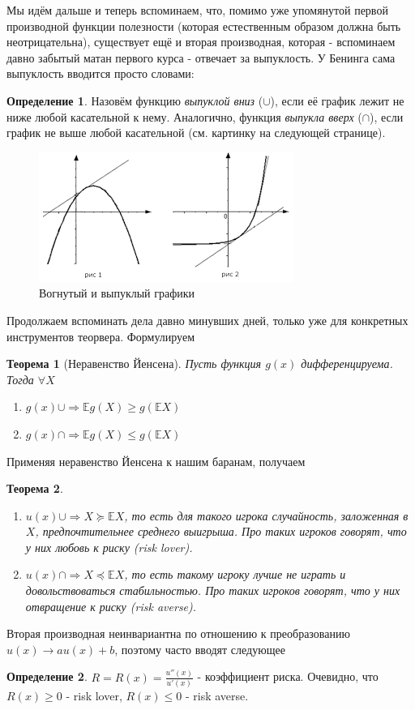 \documentclass{article}
\newtheorem{theorem}{Теорема}
\theoremstyle{definition}
\newtheorem{definition}{Определение}
\begin{document}
Мы идём дальше и теперь вспоминаем, что, помимо уже упомянутой первой производной функции полезности (которая естественным образом должна быть неотрицательна), существует ещё и вторая производная, которая - вспоминаем давно забытый матан первого курса - отвечает за выпуклость. У Бенинга сама выпуклость вводится просто словами:
\begin{definition}
Назовём функцию \textit{выпуклой вниз} ($\cup$), если её график лежит не ниже любой касательной к нему. Аналогично, функция \textit{выпукла вверх} ($\cap$), если график не выше любой касательной (см. картинку на следующей странице).
\end{definition}

\begin{figure}[h]
\centering
\includegraphics[scale=0.5]{graphics.png}
\caption{Вогнутый и выпуклый графики}
\end{figure}

Продолжаем вспоминать дела давно минувших дней, только уже для конкретных инструментов теорвера. Формулируем
\begin{theorem}[Неравенство Йенсена]
Пусть функция $g(x)$ дифференцируема. Тогда $\forall X$
\begin{enumerate}
    \item $g(x) \cup \Longrightarrow \mathbb{E}g(X) \ge g(\mathbb{E}X)$
    \item $g(x) \cap \Longrightarrow \mathbb{E}g(X) \le g(\mathbb{E}X)$
\end{enumerate}
\end{theorem}

Применяя неравенство Йенсена к нашим баранам, получаем
\begin{theorem}
\begin{enumerate}
    \item $u(x) \cup \Longrightarrow X \succeq \mathbb{E}X$, то есть для такого игрока случайность, заложенная в $X$, предпочтительнее среднего выигрыша. Про таких игроков говорят, что у них \textit{любовь к риску (risk lover)}.
    \item $u(x) \cap \Longrightarrow X \preceq \mathbb{E}X$, то есть такому игроку лучше не играть и довольствоваться стабильностью. Про таких игроков говорят, что у них \textit{отвращение к риску (risk averse)}.
\end{enumerate}
\end{theorem}
Вторая производная неинвариантна по отношению к преобразованию $u(x) \rightarrow au(x) + b$, поэтому часто вводят следующее
\begin{definition}
$R = R(x) = \frac{u''(x)}{u'(x)}$ - коэффициент риска. Очевидно, что $R(x) \ge 0$ - risk lover, $R(x) \le 0$ - risk averse.
\end{definition}
\end{document}
